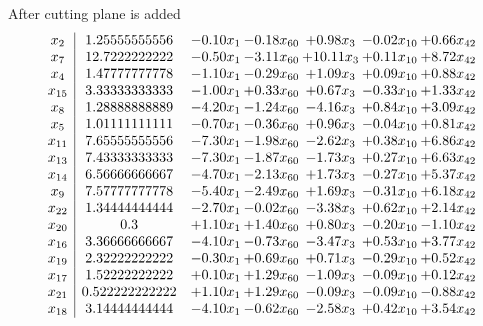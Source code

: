 \documentclass[8pt]{article}
\begin{document}
 After cutting plane is added 
\[\begin{array}{c| c c@{\hskip 2pt} c@{\hskip 2pt} c@{\hskip 2pt} c@{\hskip 2pt} c@{\hskip 2pt} }
 x_{2}   &  1.25555555556 & -0.10 x_{1} & -0.18 x_{60} & +  0.98 x_{3} & -0.02 x_{10} & +  0.66 x_{42}\\
 x_{7}   &  12.7222222222 & -0.50 x_{1} & -3.11 x_{60} & + 10.11 x_{3} & +  0.11 x_{10} & +  8.72 x_{42}\\
 x_{4}   &  1.47777777778 & -1.10 x_{1} & -0.29 x_{60} & +  1.09 x_{3} & +  0.09 x_{10} & +  0.88 x_{42}\\
 x_{15}   &  3.33333333333 & -1.00 x_{1} & +  0.33 x_{60} & +  0.67 x_{3} & -0.33 x_{10} & +  1.33 x_{42}\\
 x_{8}   &  1.28888888889 & -4.20 x_{1} & -1.24 x_{60} & -4.16 x_{3} & +  0.84 x_{10} & +  3.09 x_{42}\\
 x_{5}   &  1.01111111111 & -0.70 x_{1} & -0.36 x_{60} & +  0.96 x_{3} & -0.04 x_{10} & +  0.81 x_{42}\\
 x_{11}   &  7.65555555556 & -7.30 x_{1} & -1.98 x_{60} & -2.62 x_{3} & +  0.38 x_{10} & +  6.86 x_{42}\\
 x_{13}   &  7.43333333333 & -7.30 x_{1} & -1.87 x_{60} & -1.73 x_{3} & +  0.27 x_{10} & +  6.63 x_{42}\\
 x_{14}   &  6.56666666667 & -4.70 x_{1} & -2.13 x_{60} & +  1.73 x_{3} & -0.27 x_{10} & +  5.37 x_{42}\\
 x_{9}   &  7.57777777778 & -5.40 x_{1} & -2.49 x_{60} & +  1.69 x_{3} & -0.31 x_{10} & +  6.18 x_{42}\\
 x_{22}   &  1.34444444444 & -2.70 x_{1} & -0.02 x_{60} & -3.38 x_{3} & +  0.62 x_{10} & +  2.14 x_{42}\\
 x_{20}   &  0.3 & +  1.10 x_{1} & +  1.40 x_{60} & +  0.80 x_{3} & -0.20 x_{10} & -1.10 x_{42}\\
 x_{16}   &  3.36666666667 & -4.10 x_{1} & -0.73 x_{60} & -3.47 x_{3} & +  0.53 x_{10} & +  3.77 x_{42}\\
 x_{19}   &  2.32222222222 & -0.30 x_{1} & +  0.69 x_{60} & +  0.71 x_{3} & -0.29 x_{10} & +  0.52 x_{42}\\
 x_{17}   &  1.52222222222 & +  0.10 x_{1} & +  1.29 x_{60} & -1.09 x_{3} & -0.09 x_{10} & +  0.12 x_{42}\\
 x_{21}   &  0.522222222222 & +  1.10 x_{1} & +  1.29 x_{60} & -0.09 x_{3} & -0.09 x_{10} & -0.88 x_{42}\\
 x_{18}   &  3.14444444444 & -4.10 x_{1} & -0.62 x_{60} & -2.58 x_{3} & +  0.42 x_{10} & +  3.54 x_{42}\\

\end{array}\]
\end{document}

